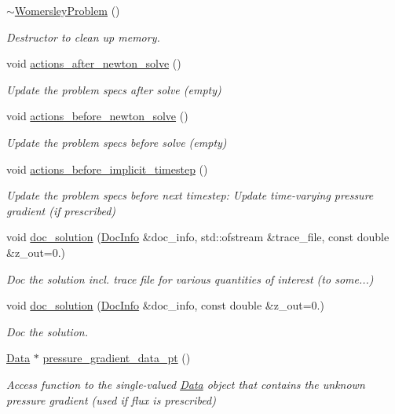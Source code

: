 \begin{DoxyCompactItemize}
\hyperlink{classoomph_1_1WomersleyProblem_a9a8cc169abe4814d9f9851f4eb936701}{$\sim$\+Womersley\+Problem} ()
\begin{DoxyCompactList}\small\item\em Destructor to clean up memory. \end{DoxyCompactList}\item 
void \hyperlink{classoomph_1_1WomersleyProblem_a248ab44d5058e1e29dab4fbfc52bf942}{actions\+\_\+after\+\_\+newton\+\_\+solve} ()
\begin{DoxyCompactList}\small\item\em Update the problem specs after solve (empty) \end{DoxyCompactList}\item 
void \hyperlink{classoomph_1_1WomersleyProblem_a7aa82fe18099c9770edf9fa8e79a2028}{actions\+\_\+before\+\_\+newton\+\_\+solve} ()
\begin{DoxyCompactList}\small\item\em Update the problem specs before solve (empty) \end{DoxyCompactList}\item 
void \hyperlink{classoomph_1_1WomersleyProblem_af87f80658aaadaee2d7c8d0c06ad159e}{actions\+\_\+before\+\_\+implicit\+\_\+timestep} ()
\begin{DoxyCompactList}\small\item\em Update the problem specs before next timestep\+: Update time-\/varying pressure gradient (if prescribed) \end{DoxyCompactList}\item 
void \hyperlink{classoomph_1_1WomersleyProblem_a6ed55a744929154a6b8d3b7bb9f0570a}{doc\+\_\+solution} (\hyperlink{classoomph_1_1DocInfo}{Doc\+Info} \&doc\+\_\+info, std\+::ofstream \&trace\+\_\+file, const double \&z\+\_\+out=0.)
\begin{DoxyCompactList}\small\item\em Doc the solution incl. trace file for various quantities of interest (to some...) \end{DoxyCompactList}\item 
void \hyperlink{classoomph_1_1WomersleyProblem_a367c83d9a996c426cb65a7baa86af81b}{doc\+\_\+solution} (\hyperlink{classoomph_1_1DocInfo}{Doc\+Info} \&doc\+\_\+info, const double \&z\+\_\+out=0.)
\begin{DoxyCompactList}\small\item\em Doc the solution. \end{DoxyCompactList}\item 
\hyperlink{classoomph_1_1Data}{Data} $\ast$ \hyperlink{classoomph_1_1WomersleyProblem_a648496a026e53b453e16c161f9f44434}{pressure\+\_\+gradient\+\_\+data\+\_\+pt} ()
\begin{DoxyCompactList}\small\item\em Access function to the single-\/valued \hyperlink{classoomph_1_1Data}{Data} object that contains the unknown pressure gradient (used if flux is prescribed) \end{DoxyCompactList}\end{DoxyCompactItemize}
